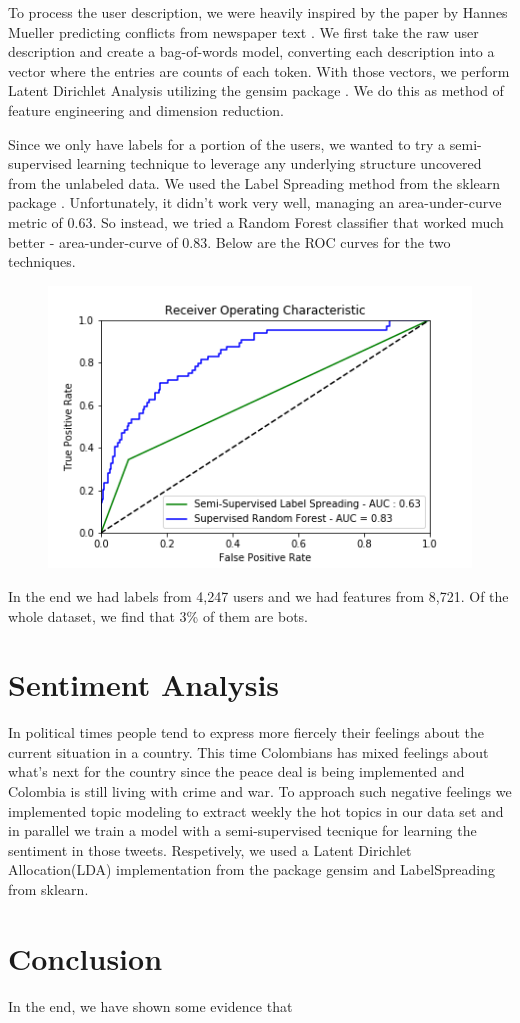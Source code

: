 \documentclass[10pt,a4paper]{article} %
\begin{document}
		To process the user description, we were heavily inspired by the paper by Hannes Mueller predicting conflicts from newspaper text \cite{mueller_rauh_2018}.  We first take the raw user description and create a bag-of-words model, converting each description into a vector where the entries are counts of each token.  With those vectors, we perform Latent Dirichlet Analysis utilizing the gensim package \cite{rehurek_lrec}.  We do this as method of feature engineering and dimension reduction.
		
		Since we only have labels for a portion of the users, we wanted to try a semi-supervised learning technique to leverage any underlying structure uncovered from the unlabeled data.  We used the Label Spreading method from the sklearn package \cite{scikit-learn}.  Unfortunately, it didn't work very well, managing an area-under-curve metric of 0.63.  So instead, we tried a Random Forest classifier that worked much better - area-under-curve of 0.83.  Below are the ROC curves for the two techniques.
		
		\begin{figure}[h!]
			\includegraphics[width=0.8\linewidth]{roc_curve}
			\centering
		\end{figure}
	
	\pagebreak 
	
	In the end we had labels from 4,247 users and we had features from 8,721.  Of the whole dataset, we find that 3\% of them are bots.
		
	\section{Sentiment Analysis}
	In political times people tend to express more fiercely their feelings about the current situation in a country. This time Colombians has mixed feelings about what's next for the country since the peace deal is being implemented and Colombia is still living with crime and war. To approach such negative feelings we implemented topic modeling to extract weekly the hot topics in our data set and in parallel we train a model with a semi-supervised tecnique for learning the sentiment in those tweets. Respetively, we used a Latent Dirichlet Allocation(LDA) implementation from the package gensim and LabelSpreading from sklearn.
	
	\section{Conclusion}
	
	In the end, we have shown some evidence that
	
	\nocite{*}
	
	
\end{document}
